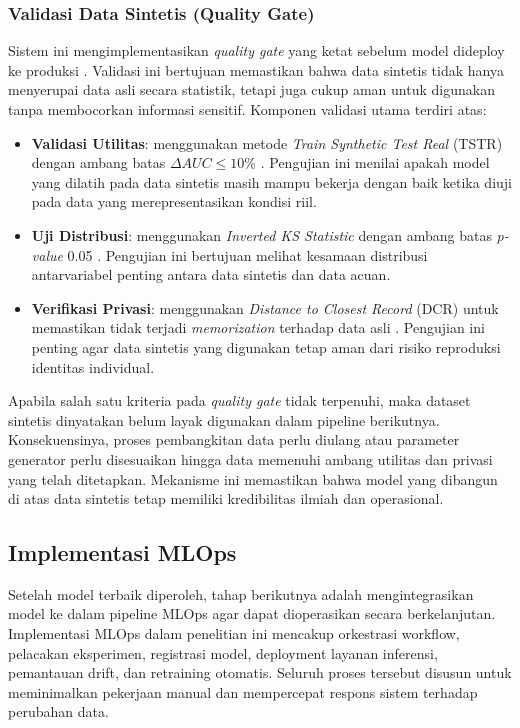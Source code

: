 \subsubsection{Validasi Data Sintetis (Quality Gate)}
Sistem ini mengimplementasikan \textit{quality gate} yang ketat sebelum model dideploy ke produksi \cite{fca2024synthetic}. Validasi ini bertujuan memastikan bahwa data sintetis tidak hanya menyerupai data asli secara statistik, tetapi juga cukup aman untuk digunakan tanpa membocorkan informasi sensitif. Komponen validasi utama terdiri atas:
\begin{itemize}
    \item \textbf{Validasi Utilitas}: menggunakan metode \textit{Train Synthetic Test Real} (TSTR) dengan ambang batas $\Delta AUC \leq 10\%$ \cite{fca2024synthetic}. Pengujian ini menilai apakah model yang dilatih pada data sintetis masih mampu bekerja dengan baik ketika diuji pada data yang merepresentasikan kondisi riil.
    \item \textbf{Uji Distribusi}: menggunakan \textit{Inverted KS Statistic} dengan ambang batas \textit{p-value} 0.05 \cite{fca2024synthetic}. Pengujian ini bertujuan melihat kesamaan distribusi antarvariabel penting antara data sintetis dan data acuan.
    \item \textbf{Verifikasi Privasi}: menggunakan \textit{Distance to Closest Record} (DCR) untuk memastikan tidak terjadi \textit{memorization} terhadap data asli \cite{fca2024synthetic}. Pengujian ini penting agar data sintetis yang digunakan tetap aman dari risiko reproduksi identitas individual.
\end{itemize}

Apabila salah satu kriteria pada \textit{quality gate} tidak terpenuhi, maka dataset sintetis dinyatakan belum layak digunakan dalam pipeline berikutnya. Konsekuensinya, proses pembangkitan data perlu diulang atau parameter generator perlu disesuaikan hingga data memenuhi ambang utilitas dan privasi yang telah ditetapkan. Mekanisme ini memastikan bahwa model yang dibangun di atas data sintetis tetap memiliki kredibilitas ilmiah dan operasional.

\subsection{Implementasi MLOps}
Setelah model terbaik diperoleh, tahap berikutnya adalah mengintegrasikan model ke dalam pipeline MLOps agar dapat dioperasikan secara berkelanjutan. Implementasi MLOps dalam penelitian ini mencakup orkestrasi workflow, pelacakan eksperimen, registrasi model, deployment layanan inferensi, pemantauan drift, dan retraining otomatis. Seluruh proses tersebut disusun untuk meminimalkan pekerjaan manual dan mempercepat respons sistem terhadap perubahan data.

